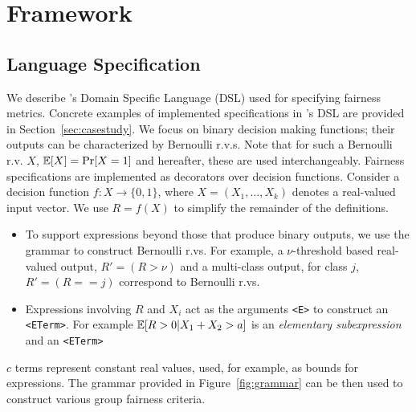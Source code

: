 \section{\AVOIRmethodname{} Framework}
\label{sec:theoretical}
\subsection{Language Specification}
\label{sec:theoretical:specification}

 
We describe \AVOIRmethodname{}'s Domain Specific Language (DSL) used for specifying fairness metrics.
Concrete examples of implemented specifications in \AVOIRmethodname{}'s DSL are provided in Section~\ref{sec:casestudy}.
We focus on binary decision making functions; their outputs can be characterized by Bernoulli r.v.s.
Note that for such a Bernoulli r.v. $X$, $\mathbb{E}[X] = \Pr[X = 1]$ and hereafter, these are used interchangeably. 
Fairness specifications are implemented as decorators over decision functions.
Consider a decision function $f: X \rightarrow \{0, 1\}$, where $X = (X_1, \dots, X_k)$ denotes a real-valued input vector.  We use $R = f(X)$ to simplify the remainder of the definitions. 
\begin{itemize}
    \item  To support expressions beyond those that produce binary outputs, we use the grammar to construct Bernoulli r.vs. For example, a $\nu$-threshold based real-valued output, $R' = (R > \nu)$ and a multi-class output, for class $j$,  $R' = (R == j)$ correspond to Bernoulli r.vs.
    \item  Expressions involving $R$ and $X_i$ act as the arguments \lstinline{<E>} to construct an \lstinline{<ETerm>}. For example  $\mathbb{E}[R > 0 | X_1 + X_2 > a]$ is an \textit{elementary subexpression} and an \lstinline{<ETerm>}
\end{itemize}
$c$ terms represent constant real values, used, for example, as bounds for expressions.
The grammar provided in Figure~\ref{fig:grammar} can be then used to construct various group fairness criteria.
